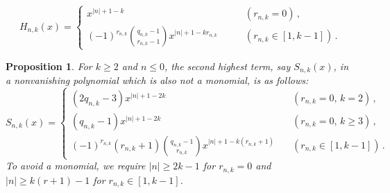 \documentclass[10pt,a4paper]{amsart}
\newtheorem{proposition}{Proposition}
\begin{document}
\begin{equation}
\label{eq:high_term_neg}    
H_{n,k}(x) = \begin{cases} x^{|n|+1-k} &\qquad (r_{n,k}=0)\,,\phantom{\biggl|}
  \\ \displaystyle
  (-1)^{r_{n,k}} \binom{q_{n,k}-1}{r_{n,k}-1}x^{|n|+1-kr_{n,k}} &\qquad (r_{n,k}\in[1,k-1])\,. \end{cases} 
\end{equation}

\begin{proposition}\label{prop:sec_highest_neg}
For $k\ge2$ and $n\le0$, the second highest term, say $S_{n,k}(x)$, in a nonvanishing polynomial which is also not a monomial, is as follows:
\begin{equation}
\label{eq:sec_term_neg}    
S_{n,k}(x) = \begin{cases}
(2q_{n,k}-3)x^{|n|+1-2k} &\quad (r_{n,k}=0,\, k=2)\,,\phantom{\biggl|} \\
(q_{n,k}-1)x^{|n|+1-2k} &\quad (r_{n,k}=0,\, k\ge3)\,,\phantom{\biggl|} 
  \\ \displaystyle (-1)^{r_{n,k}} (r_{n,k}+1)\binom{q_{n,k}-1}{r_{n,k}}x^{|n|+1-k(r_{n,k}+1)} &\quad (r_{n,k}\in[1,k-1])\,. \end{cases} 
\end{equation}
To avoid a monomial, we require $|n|\ge 2k-1$ for $r_{n,k}=0$ and $|n|\ge k(r+1)-1$ for $r_{n,k}\in[1,k-1]$.
\end{proposition}
\end{document}
